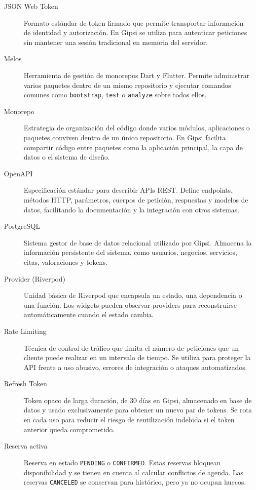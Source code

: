 \documentclass[12pt,a4paper,twoside]{report}
\begin{document}
\begin{description}
  \item[JSON Web Token]
  Formato estándar de token firmado que permite transportar información de identidad
  y autorización. En Gipsi se utiliza para autenticar peticiones sin mantener una sesión
  tradicional en memoria del servidor.

  \item[Melos]
  Herramienta de gestión de monorepos Dart y Flutter. Permite administrar varios paquetes
  dentro de un mismo repositorio y ejecutar comandos comunes como \texttt{bootstrap},
  \texttt{test} o \texttt{analyze} sobre todos ellos.

  \item[Monorepo]
  Estrategia de organización del código donde varios módulos, aplicaciones o paquetes
  conviven dentro de un único repositorio. En Gipsi facilita compartir código entre
  paquetes como la aplicación principal, la capa de datos o el sistema de diseño.

  \item[OpenAPI]
  Especificación estándar para describir APIs REST. Define endpoints, métodos HTTP,
  parámetros, cuerpos de petición, respuestas y modelos de datos, facilitando la
  documentación y la integración con otros sistemas.

  \item[PostgreSQL]
  Sistema gestor de base de datos relacional utilizado por Gipsi. Almacena la información
  persistente del sistema, como usuarios, negocios, servicios, citas, valoraciones y tokens.

  \item[Provider (Riverpod)]
  Unidad básica de Riverpod que encapsula un estado, una dependencia o una función.
  Los widgets pueden observar providers para reconstruirse automáticamente cuando el
  estado cambia.

  \item[Rate Limiting]
  Técnica de control de tráfico que limita el número de peticiones que un cliente puede
  realizar en un intervalo de tiempo. Se utiliza para proteger la API frente a uso abusivo,
  errores de integración o ataques automatizados.

  \item[Refresh Token]
  Token opaco de larga duración, de 30 días en Gipsi, almacenado en base de datos y usado
  exclusivamente para obtener un nuevo par de tokens. Se rota en cada uso para reducir
  el riesgo de reutilización indebida si el token anterior queda comprometido.

  \item[Reserva activa]
  Reserva en estado \texttt{PENDING} o \texttt{CONFIRMED}. Estas reservas bloquean
  disponibilidad y se tienen en cuenta al calcular conflictos de agenda. Las reservas
  \texttt{CANCELED} se conservan para histórico, pero ya no ocupan huecos.


\end{description}
\end{document}
